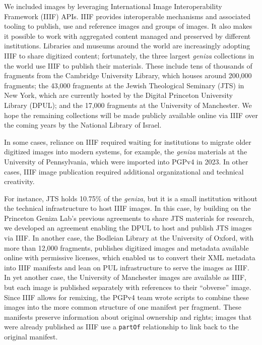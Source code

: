 \documentclass{article}
\begin{document}
We included images by leveraging International Image Interoperability Framework (IIIF) APIs. IIIF provides interoperable mechanisms and associated tooling to publish, use and reference images and groups of images. It also makes it possible to work with aggregated content managed and preserved by different institutions. Libraries and museums around the world are increasingly adopting IIIF to share digitized content; fortunately, the three largest \textit{geniza} collections in the world use IIIF to publish their materials. These include tens of thousands of fragments from the Cambridge University Library, which houses around 200,000 fragments; the 43,000 fragments at the Jewish Theological Seminary (JTS) in New York, which are currently hosted by the Digital Princeton University Library (DPUL); and the 17,000 fragments at the University of Manchester. We hope the remaining collections will be made publicly available online via IIIF over the coming years by the National Library of Israel.

In some cases, reliance on IIIF required waiting for institutions to migrate older digitized images into modern systems, for example, the \textit{geniza} materials at the University of Pennsylvania, which were imported into PGPv4 in 2023. In other cases, IIIF image publication required additional organizational and technical creativity. 

For instance, JTS holds 10.75\% of the \textit{geniza}, but it is a small institution without the technical infrastructure to host IIIF images. In this case, by building on the Princeton Geniza Lab’s previous agreements to share JTS materials for research, we developed an agreement enabling the DPUL to host and publish JTS images via IIIF. In another case, the Bodleian Library at the University of Oxford, with more than 12,000 fragments, publishes digitized images and metadata available online with permissive licenses, which enabled us to convert their XML metadata into IIIF manifests and lean on PUL infrastructure to serve the images as IIIF. In yet another case, the University of Manchester images are available as IIIF, but each image is published separately with references to their “obverse” image. Since IIIF allows for remixing, the PGPv4 team wrote scripts to combine these images into the more common structure of one manifest per fragment. These manifests preserve information about original ownership and rights; images that were already published as IIIF use a \texttt{partOf} relationship to link back to the original manifest.
\end{document}

